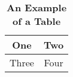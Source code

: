 \begin{table}
\caption{\textbf{\label{tab:1} An Example of a Table}}
\begin{tabular}{cc}
\hline
One & Two\\
\hline
Three & Four\\
\hline
\end{tabular}
\end{table}